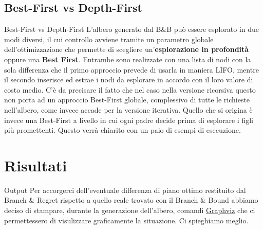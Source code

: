 \documentclass[10pt]{beamer}
\begin{document}
    \subsection{Best-First vs Depth-First}\label{sec:bf-vs-df}
    \begin{frame}{Best-First vs Depth-First}
        L'albero generato dal B\&B può essere esplorato in due modi diversi, il cui controllo avviene tramite un parametro globale dell'ottimizzazione che permette di scegliere un'\textbf{esplorazione in profondità} oppure una \textbf{Best First}. Entrambe sono realizzate con una lista di nodi con la sola differenza che il primo approccio prevede di usarla in maniera LIFO, mentre il secondo inserisce ed estrae i nodi da esplorare in accordo con il loro valore di costo medio. C'è da precisare il fatto che nel caso nella versione ricorsiva questo non porta ad un approccio Best-First globale, complessivo di tutte le richieste nell'albero, come invece accade per la versione iterativa. Quello che si origina è invece una Best-First a livello in cui ogni padre decide prima di esplorare i figli più promettenti. Questo verrà chiarito con un paio di esempi di esecuzione.
    \end{frame}

    \section{Risultati}\label{sec:risultati}
    \begin{frame}{Output}
        Per accorgerci dell'eventuale differenza di piano ottimo restituito dal Branch \& Regret rispetto a quello reale trovato con il Branch \& Bound abbiamo deciso di stampare, durante la generazione dell'albero, comandi \href{https://graphviz.org/}{Graphviz} che ci permettessero di visulizzare graficamente la situazione. Ci spieghiamo meglio. 
    \end{frame}
\end{document}
